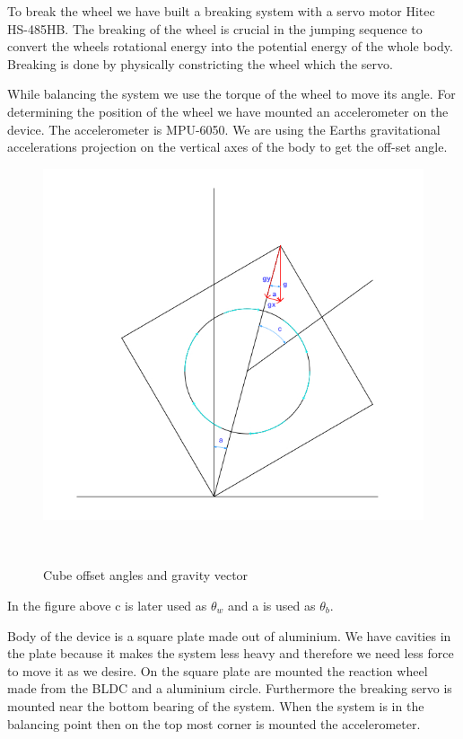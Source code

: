 To break the wheel we have built a breaking system with a servo motor Hitec HS-485HB.
The breaking of the wheel is crucial in the jumping sequence to convert the wheels rotational energy into the potential energy of the whole body.
Breaking is done by physically constricting the wheel which the servo.

While balancing the system we use the torque of the wheel to move its angle.
For determining the position of the wheel we have mounted an accelerometer on the device.
The accelerometer is MPU-6050.
We are using the Earths gravitational accelerations projection on the vertical axes of the body to get the off-set angle.
\begin{figure}[H]

	
	\centering
 	\includegraphics[width=1\textwidth]{images/kuubik1crop2.jpg}
	
	~
	\caption{Cube offset angles and gravity vector} 
 	\label{fig:mech} 
\end{figure}

In the figure above c is later used as $\theta_{w}$ and a is used as $\theta_{b}$.


Body of the device is a square plate made out of aluminium.
We have cavities in the plate because it makes the system less heavy and therefore we need less force to move it as we desire.
On the square plate are mounted the reaction wheel made from the BLDC and a aluminium circle.
Furthermore the breaking servo is mounted near the bottom bearing of the system.
When the system is in the balancing point then on the top most corner is mounted the accelerometer.

